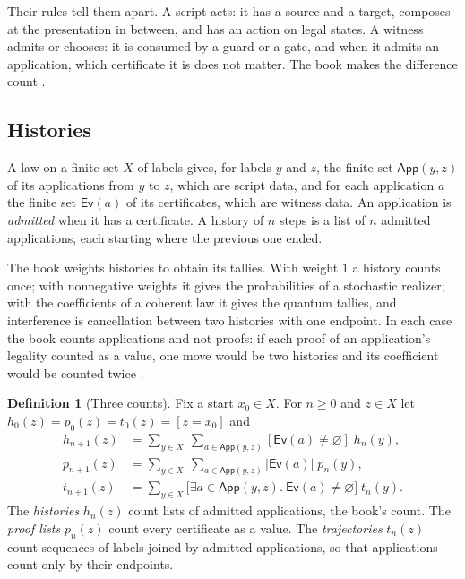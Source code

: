 \documentclass[11pt]{article}
\numberwithin{equation}{section}
\theoremstyle{definition}
\newtheorem{definition}{Definition}[section]
\theoremstyle{plain}
\theoremstyle{remark}
\begin{document}
Their rules tell them apart.  A script acts: it has a source and a target,
composes at the presentation in between, and has an action on legal states.
A witness admits or chooses: it is consumed by a guard or a gate, and when it
admits an application, which certificate it is does not matter.  The book
makes the difference count \cite[\S7.4]{Book}.

\subsection{Histories}

A law on a finite set \(X\) of labels gives, for labels \(y\) and \(z\), the
finite set \(\mathsf{App}(y,z)\) of its applications from \(y\) to \(z\),
which are script data, and for each application \(a\) the finite set
\(\mathsf{Ev}(a)\) of its certificates, which are witness data.  An
application is \emph{admitted} when it has a certificate.  A history of
\(n\) steps is a list of \(n\) admitted applications, each starting where the
previous one ended.

The book weights histories to obtain its tallies.  With weight \(1\) a
history counts once; with nonnegative weights it gives the probabilities of a
stochastic realizer; with the coefficients of a coherent law it gives the
quantum tallies, and interference is cancellation between two histories with
one endpoint.  In each case the book counts applications and not proofs: if
each proof of an application's legality counted as a value, one move would be
two histories and its coefficient would be counted twice
\cite[\S7.4]{Book}.

\begin{definition}[Three counts]\label{def:counts}
Fix a start \(x_0\in X\).  For \(n\ge0\) and \(z\in X\) let
\(h_0(z)=p_0(z)=t_0(z)=[z=x_0]\) and
\[
\begin{aligned}
 h_{n+1}(z)&=\sum_{y\in X}\ \sum_{a\in\mathsf{App}(y,z)}
   [\mathsf{Ev}(a)\ne\varnothing]\;h_n(y),\\
 p_{n+1}(z)&=\sum_{y\in X}\ \sum_{a\in\mathsf{App}(y,z)}
   |\mathsf{Ev}(a)|\;p_n(y),\\
 t_{n+1}(z)&=\sum_{y\in X}
   \bigl[\exists a\in\mathsf{App}(y,z).\ \mathsf{Ev}(a)\ne\varnothing\bigr]\;t_n(y).
\end{aligned}
\]
The \emph{histories} \(h_n(z)\) count lists of admitted applications, the
book's count.  The \emph{proof lists} \(p_n(z)\) count every certificate as a
value.  The \emph{trajectories} \(t_n(z)\) count sequences of labels joined by
admitted applications, so that applications count only by their endpoints.
\end{definition}
\end{document}
